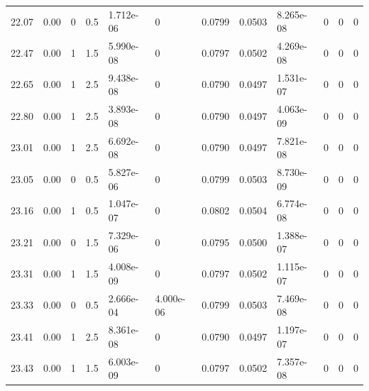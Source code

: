 \documentclass[preview]{standalone}
\begin{document}
{{{{{\begin{tabular}{L{1.2cm}C{1.2cm} C{0.3cm}C{0.5cm} C{1.4cm}C{1.4cm} C{1.4cm}C{1.4cm} C{1.6cm}C{1.6cm} C{1.6cm}C{1.6cm}}
  22.07  &  0.00  & 0     & 0.5 &  1.712e-06  & 0  &  0.0799&   0.0503& 8.265e-08 & 0   &  0 & 0  \\ 
  22.47  &  0.00  & 1     & 1.5 &  5.990e-08  & 0  &  0.0797&   0.0502& 4.269e-08 & 0   &  0 & 0  \\ 
  22.65  &  0.00  & 1     & 2.5 &  9.438e-08  & 0  &  0.0790&   0.0497& 1.531e-07 & 0   &  0 & 0  \\ 
  22.80  &  0.00  & 1     & 2.5 &  3.893e-08  & 0  &  0.0790&   0.0497& 4.063e-09 & 0   &  0 & 0  \\ 
  23.01  &  0.00  & 1     & 2.5 &  6.692e-08  & 0  &  0.0790&   0.0497& 7.821e-08 & 0   &  0 & 0  \\ 
  23.05  &  0.00  & 0     & 0.5 &  5.827e-06  & 0  &  0.0799&   0.0503& 8.730e-09 & 0   &  0 & 0  \\ 
  23.16  &  0.00  & 1     & 0.5 &  1.047e-07  & 0  &  0.0802&   0.0504& 6.774e-08 & 0   &  0 & 0  \\ 
  23.21  &  0.00  & 0     & 1.5 &  7.329e-06  & 0  &  0.0795&   0.0500& 1.388e-07 & 0   &  0 & 0  \\ 
  23.31  &  0.00  & 1     & 1.5 &  4.008e-09  & 0  &  0.0797&   0.0502& 1.115e-07 & 0   &  0 & 0  \\ 
  23.33  &  0.00  & 0     & 0.5 &  2.666e-04  & 4.000e-06  &  0.0799&   0.0503& 7.469e-08 & 0   &  0 & 0  \\ 
  23.41  &  0.00  & 1     & 2.5 &  8.361e-08  & 0  &  0.0790&   0.0497& 1.197e-07 & 0   &  0 & 0  \\ 
  23.43  &  0.00  & 1     & 1.5 &  6.003e-09  & 0  &  0.0797&   0.0502& 7.357e-08 & 0   &  0 & 0  \\ 
\hline 
\end{tabular} 

}}}}}
\end{document}
